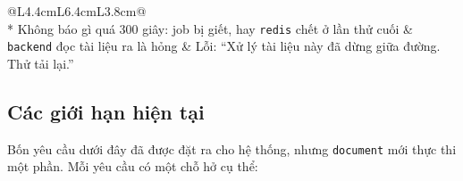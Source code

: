 \begin{longtable}{@{}L{4.4cm}L{6.4cm}L{3.8cm}@{}}
 \\*
\addlinespace
Không báo gì quá 300 giây: job bị giết, hay \texttt{redis} chết ở lần thử cuối & \texttt{backend} đọc tài liệu ra là hỏng & Lỗi: ``Xử lý tài liệu này đã dừng giữa đường. Thử tải lại.'' \\
\end{longtable}

\subsection{Các giới hạn hiện tại}
\label{sec:doc-gioi-han}

Bốn yêu cầu dưới đây đã được đặt ra cho hệ thống, nhưng \texttt{document} mới thực thi một phần. Mỗi
yêu cầu có một chỗ hở cụ thể:

